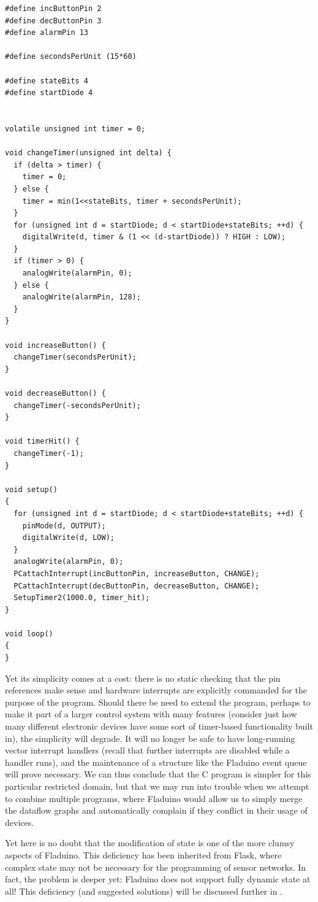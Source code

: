 \documentclass[a4paper, oneside, final]{memoir}
\let\Fref\undefined
\begin{document}
\begin{verbatim}
#define incButtonPin 2
#define decButtonPin 3
#define alarmPin 13

#define secondsPerUnit (15*60)

#define stateBits 4
#define startDiode 4


volatile unsigned int timer = 0;

void changeTimer(unsigned int delta) {
  if (delta > timer) {
    timer = 0;
  } else {
    timer = min(1<<stateBits, timer + secondsPerUnit);
  }
  for (unsigned int d = startDiode; d < startDiode+stateBits; ++d) {
    digitalWrite(d, timer & (1 << (d-startDiode)) ? HIGH : LOW);
  }
  if (timer > 0) {
    analogWrite(alarmPin, 0);
  } else {
    analogWrite(alarmPin, 128);
  }
}

void increaseButton() {
  changeTimer(secondsPerUnit);
}

void decreaseButton() {
  changeTimer(-secondsPerUnit);
}

void timerHit() {
  changeTimer(-1);
}

void setup()
{
  for (unsigned int d = startDiode; d < startDiode+stateBits; ++d) {
    pinMode(d, OUTPUT);
    digitalWrite(d, LOW);
  }
  analogWrite(alarmPin, 0);
  PCattachInterrupt(incButtonPin, increaseButton, CHANGE);
  PCattachInterrupt(decButtonPin, decreaseButton, CHANGE);
  SetupTimer2(1000.0, timer_hit);
}

void loop()
{
}
\end{verbatim}

Yet its simplicity comes at a cost: there is no static checking that
the pin references make sense and hardware interrupts are explicitly
commanded for the purpose of the program.  Should there be need to
extend the program, perhaps to make it part of a larger control system
with many features (consider just how many different electronic
devices have some sort of timer-based functionality built in), the
simplicity will degrade.  It will no longer be safe to have
long-running vector interrupt handlers (recall that further interrupts
are disabled while a handler runs), and the maintenance of a structure
like the Fladuino event queue will prove necessary.  We can thus
conclude that the C program is simpler for this particular restricted
domain, but that we may run into trouble when we attempt to combine
multiple programs, where Fladuino would allow us to simply merge the
dataflow graphs and automatically complain if they conflict in their
usage of devices.

Yet here is no doubt that the modification of state is one of the more
clumsy aspects of Fladuino.  This deficiency has been inherited from
Flask, where complex state may not be necessary for the programming of
sensor networks.  In fact, the problem is deeper yet: Fladuino does
not support fully dynamic state at all!  This deficiency (and
suggested solutions) will be discussed further in
\Fref{chap:futurework}.
\end{document}
